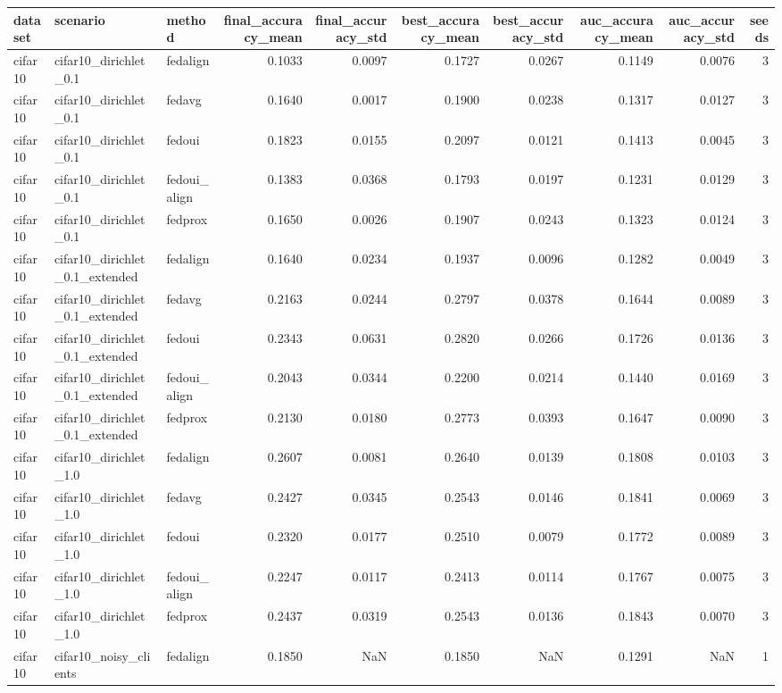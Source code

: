 \begin{tabular}{lllrrrrrrr}
\toprule
dataset & scenario & method & final_accuracy_mean & final_accuracy_std & best_accuracy_mean & best_accuracy_std & auc_accuracy_mean & auc_accuracy_std & seeds \\
\midrule
cifar10 & cifar10_dirichlet_0.1 & fedalign & 0.1033 & 0.0097 & 0.1727 & 0.0267 & 0.1149 & 0.0076 & 3 \\
cifar10 & cifar10_dirichlet_0.1 & fedavg & 0.1640 & 0.0017 & 0.1900 & 0.0238 & 0.1317 & 0.0127 & 3 \\
cifar10 & cifar10_dirichlet_0.1 & fedoui & 0.1823 & 0.0155 & 0.2097 & 0.0121 & 0.1413 & 0.0045 & 3 \\
cifar10 & cifar10_dirichlet_0.1 & fedoui_align & 0.1383 & 0.0368 & 0.1793 & 0.0197 & 0.1231 & 0.0129 & 3 \\
cifar10 & cifar10_dirichlet_0.1 & fedprox & 0.1650 & 0.0026 & 0.1907 & 0.0243 & 0.1323 & 0.0124 & 3 \\
cifar10 & cifar10_dirichlet_0.1_extended & fedalign & 0.1640 & 0.0234 & 0.1937 & 0.0096 & 0.1282 & 0.0049 & 3 \\
cifar10 & cifar10_dirichlet_0.1_extended & fedavg & 0.2163 & 0.0244 & 0.2797 & 0.0378 & 0.1644 & 0.0089 & 3 \\
cifar10 & cifar10_dirichlet_0.1_extended & fedoui & 0.2343 & 0.0631 & 0.2820 & 0.0266 & 0.1726 & 0.0136 & 3 \\
cifar10 & cifar10_dirichlet_0.1_extended & fedoui_align & 0.2043 & 0.0344 & 0.2200 & 0.0214 & 0.1440 & 0.0169 & 3 \\
cifar10 & cifar10_dirichlet_0.1_extended & fedprox & 0.2130 & 0.0180 & 0.2773 & 0.0393 & 0.1647 & 0.0090 & 3 \\
cifar10 & cifar10_dirichlet_1.0 & fedalign & 0.2607 & 0.0081 & 0.2640 & 0.0139 & 0.1808 & 0.0103 & 3 \\
cifar10 & cifar10_dirichlet_1.0 & fedavg & 0.2427 & 0.0345 & 0.2543 & 0.0146 & 0.1841 & 0.0069 & 3 \\
cifar10 & cifar10_dirichlet_1.0 & fedoui & 0.2320 & 0.0177 & 0.2510 & 0.0079 & 0.1772 & 0.0089 & 3 \\
cifar10 & cifar10_dirichlet_1.0 & fedoui_align & 0.2247 & 0.0117 & 0.2413 & 0.0114 & 0.1767 & 0.0075 & 3 \\
cifar10 & cifar10_dirichlet_1.0 & fedprox & 0.2437 & 0.0319 & 0.2543 & 0.0136 & 0.1843 & 0.0070 & 3 \\
cifar10 & cifar10_noisy_clients & fedalign & 0.1850 & NaN & 0.1850 & NaN & 0.1291 & NaN & 1 \\

\end{tabular}
